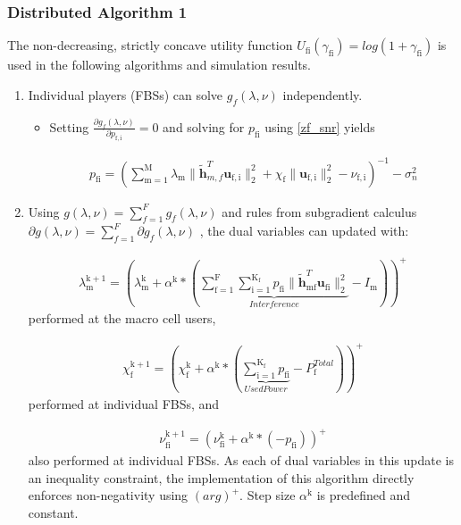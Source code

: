 \documentclass[12pt,a4paper]{report}
\begin{document}
\subsubsection{Distributed Algorithm 1}\label{algo1}
The non-decreasing, strictly concave utility function $U_{\text{fi}}(\gamma_{\text{fi}}) = log(1+\gamma_{\text{fi}})$ 
is used in the following algorithms and simulation results.

\begin{enumerate}
\item 
Individual players (FBSs) can solve $ g_f(\lambda,\nu) $ independently.
\begin{itemize}
\item Setting $\frac{\partial g_f(\lambda,\nu)}{\partial p_{\mathrm{f,i}}} = 0$ 
and solving for $p_{\mathrm{fi}}$ using \eqref{zf_snr} yields

\begin{gather}
p_{\mathrm{fi}} = (\sum_{\mathrm{m=1}}^{\mathrm{M}}\lambda_{\mathrm{m}}\|\mathbf{\tilde{h}}_{m,f}^T \mathbf{u}_{\mathrm{f,i}}\|^2_2
+\chi_{\text{f}} \|\mathbf{u}_{\mathrm{f,i}}\|^2_2
-\nu_{\mathrm{f,i}}
 )^{-1}
  - \sigma^2_n
\end{gather}

\end{itemize}
\item 
Using $g(\lambda,\nu) = \sum_{f=1}^{F}g_f(\lambda,\nu)$ and rules from subgradient calculus 
$\partial g(\lambda,\nu) = \sum_{f=1}^{F} \partial g_f(\lambda,\nu)$ 
, the dual variables can updated with:

\begin{gather}
\lambda_{\mathrm{m}}^{\mathrm{k+1}} = (
\lambda_{\mathrm{m}}^{\mathrm{k}}
+
\alpha^{\mathrm{k}}*
(
\underbrace{
\sum _{\mathrm{f=1}}^{\mathrm{F}}
\sum _{\mathrm{i=1}}^{\mathrm{K_{\mathrm{f}}}}
p_{\mathrm{fi}}
\|\mathbf{\tilde{h}}_{\mathrm{mf}}^T \mathbf{u_{\mathrm{fi}}}\|^2_2}_{Interference}
- I_{\mathrm{m}}
))^+
\end{gather}
performed at the macro cell users,

\begin{gather}
\chi_{\mathrm{f}}^{\mathrm{k+1}} = (
\chi_{\mathrm{f}}^{\mathrm{k}}
+
\alpha^{\mathrm{k}}*
(\underbrace{\sum_{\mathrm{i=1}}^{\mathrm{K_{\mathrm{f}}}} p_{\mathrm{fi}}}_{Used Power} - P_{\mathrm{f}}^{Total}) )^+
\end{gather}
performed at individual FBSs, and 

\begin{gather}
\nu_{\mathrm{fi}}^{\mathrm{k+1}} = (
\nu_{\mathrm{fi}}^{\mathrm{k}}
+
\alpha^{\mathrm{k}}*
(-p_{\mathrm{fi}}))^+
\end{gather}
also performed at individual FBSs.
As each of dual variables in this update is an inequality constraint, the implementation of this algorithm directly enforces non-negativity using 
$(arg)^+$.
Step size $\alpha^{\mathrm{k}}$ is predefined and constant.



\end{enumerate} 
\end{document}
